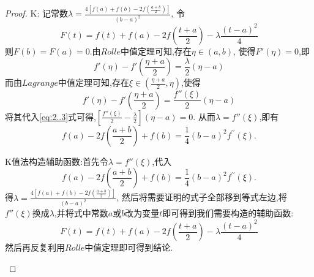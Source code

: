 \documentclass[lang=cn,newtx,10pt,scheme=chinese]{elegantbook}
\begin{document}
\begin{example}
\begin{proof}
        {\color{blue} K}:
        记常数$\lambda=\frac{4\left[ f\left( a \right) +f\left( b \right) -2f\left( \frac{a+b}{2} \right) \right]}{\left( b-a \right) ^2}$,
        令
        \begin{equation}
             F\left( t \right) =f\left( t \right) +f\left( a \right) -2f\left( \frac{t+a}{2} \right) -\lambda \frac{\left( t-a \right) ^2}{4}
             \nonumber
        \end{equation}
       则$F(b)=F(a)=0$.由$Rolle$中值定理可知,存在$\eta\in(a,b)$,
       使得$F'(\eta)=0$,即
       \begin{equation}\label{eq:2..3}
        f'\left( \eta \right) -f'\left( \frac{\eta +a}{2} \right) =\frac{\lambda}{2}\left( \eta -a \right)
       \end{equation}
       而由$Lagrange$中值定理可知,存在$\xi\in(\frac{\eta +a}{2},\eta)$,使得
       \begin{equation}
        f'\left( \eta \right) -f'\left( \frac{\eta +a}{2} \right) =\frac{f''\left( \xi \right)}{2}\left( \eta -a \right)
        \nonumber
       \end{equation}
       将其代入\eqref{eq:2..3}式可得,$\left[ \frac{f''\left( \xi \right)}{2}-\frac{\lambda}{2} \right] \left( \eta -a \right) =0$.
       从而$\lambda=f''(\xi)$,即有
       \begin{equation}
        f(a)-2f\left(\frac{a + b}{2}\right)+f(b)=\frac{1}{4}(b - a)^{2}f^{\prime\prime}(\xi).
        \nonumber
       \end{equation}
       
        \begin{remark}
            K值法构造辅助函数:首先令$\lambda=f''(\xi)$,代入
            \begin{equation}
                f(a)-2f\left(\frac{a + b}{2}\right)+f(b)=\frac{1}{4}(b - a)^{2}f^{\prime\prime}(\xi).
                \nonumber
            \end{equation}
            得$\lambda=\frac{4\left[ f\left( a \right) +f\left( b \right) -2f\left( \frac{a+b}{2} \right) \right]}{\left( b-a \right) ^2}$,
            然后将需要证明的式子全部移到等式左边,将$f''(\xi)$换成$\lambda$,并将式中常数$a$或$b$改为变量$t$即可得到我们需要构造的辅助函数:
            \begin{equation}
                F\left( t \right) =f\left( t \right) +f\left( a \right) -2f\left( \frac{t+a}{2} \right) -\lambda \frac{\left( t-a \right) ^2}{4}
                \nonumber
            \end{equation}
            然后再反复利用$Rolle$中值定理即可得到结论.
        \end{remark}


\end{proof}
\end{example}
\end{document}
